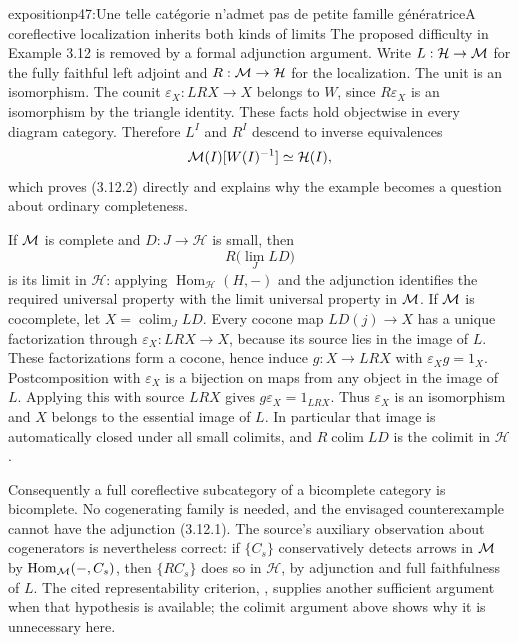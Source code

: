 \begin{dcomment}{exposition}{p47:Une telle catégorie n'admet pas de petite famille génératrice}{A coreflective localization inherits both kinds of limits}
The proposed difficulty in Example 3.12 is removed by a formal adjunction argument. Write $L:\mathcal H\to\mathcal{M}$ for the fully faithful left adjoint and $R:\mathcal{M}\to\mathcal H$ for the localization. The unit is an isomorphism. The counit $\varepsilon_X:LRX\to X$ belongs to $W$, since $R\varepsilon_X$ is an isomorphism by the triangle identity. These facts hold objectwise in every diagram category. Therefore $L^I$ and $R^I$ descend to inverse equivalences
\[
 \mathcal{M}(I)[W(I)^{-1}]\simeq\mathcal H(I),
\]
which proves (3.12.2) directly and explains why the example becomes a question about ordinary completeness.

If $\mathcal{M}$ is complete and $D:J\to\mathcal H$ is small, then
\[
 R\bigl(\lim_J LD\bigr)
\]
is its limit in $\mathcal H$: applying $\operatorname{Hom}_{\mathcal H}(H,-)$ and the adjunction identifies the required universal property with the limit universal property in $\mathcal{M}$. If $\mathcal{M}$ is cocomplete, let $X=\operatorname{colim}_J LD$. Every cocone map $LD(j)\to X$ has a unique factorization through $\varepsilon_X:LRX\to X$, because its source lies in the image of $L$. These factorizations form a cocone, hence induce $g:X\to LRX$ with $\varepsilon_Xg=1_X$. Postcomposition with $\varepsilon_X$ is a bijection on maps from any object in the image of $L$. Applying this with source $LRX$ gives $g\varepsilon_X=1_{LRX}$. Thus $\varepsilon_X$ is an isomorphism and $X$ belongs to the essential image of $L$. In particular that image is automatically closed under all small colimits, and $R\operatorname{colim}LD$ is the colimit in $\mathcal H$.

Consequently a full coreflective subcategory of a bicomplete category is bicomplete. No cogenerating family is needed, and the envisaged counterexample cannot have the adjunction (3.12.1). The source's auxiliary observation about cogenerators is nevertheless correct: if $\{C_s\}$ conservatively detects arrows in $\mathcal{M}$ by $\operatorname{Hom}_{\mathcal{M}}(-,C_s)$, then $\{RC_s\}$ does so in $\mathcal H$, by adjunction and full faithfulness of $L$. The cited representability criterion, \citet[Expos\'e~I, 8.12.7]{SGA4I1972}, supplies another sufficient argument when that hypothesis is available; the colimit argument above shows why it is unnecessary here.
\end{dcomment}


